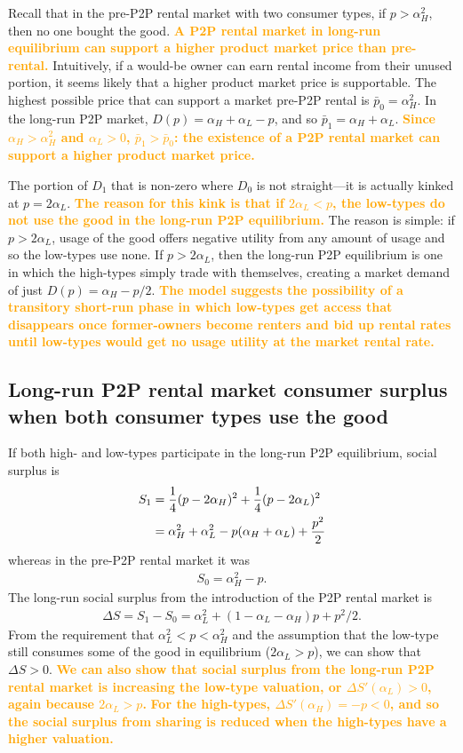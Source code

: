 \documentclass[11pt]{article}
\newcommand{\important}[1]{\textcolor{orange}{\textbf{#1}}}
\newcommand{\important}[1]{#1}
\begin{document}
Recall that in the pre-P2P rental market with two consumer types, if $p > \alpha_H^2$, then no one bought the good. 
\important{A P2P rental market in long-run equilibrium can support a higher product market price than pre-rental.}  
Intuitively, if a would-be owner can earn rental income from their unused portion, it seems likely that a higher product market price is supportable. 
The highest possible price that can support a market pre-P2P rental is $\bar{p}_0 = \alpha_H^2$.  
In the long-run P2P market, $D(p) = \alpha_H + \alpha_L - p$, and so $\bar{p}_{1} = \alpha_H + \alpha_L$. 
\important{Since $\alpha_H > \alpha_H^2$ and $\alpha_L > 0$, $\bar{p}_1 > \bar{p}_0$: the existence of a P2P rental market can support a higher product market price.} 

The portion of $D_1$ that is non-zero where $D_0$ is not straight---it is actually kinked at $p = 2\alpha_L$. 
\important{The reason for this kink is that if $2\alpha_L < p$, the low-types do not use the good in the long-run P2P equilibrium.} 
The reason is simple: if $p > 2\alpha_L$, usage of the good offers negative utility from any amount of usage and so the low-types use none. 
If $p > 2 \alpha_L$, then the long-run P2P equilibrium is one in which the high-types simply trade with themselves, creating a market demand of just $D(p) = \alpha_H - p/2$. 
\important{The model suggests the possibility of a transitory short-run phase in which low-types get access that disappears once former-owners become renters and bid up rental rates until low-types would get no usage utility at the market rental rate.} 

\subsection{Long-run P2P rental market consumer surplus when both consumer types use the good} 
If both high- and low-types participate in the long-run P2P equilibrium, social surplus is 
\begin{align} 
S_1 & = \frac{1}{4}(p - 2\alpha_H)^2 + \frac{1}{4}(p - 2\alpha_L)^2 \notag \\
    & = \alpha_H^2 + \alpha_L^2 - p(\alpha_H + \alpha_L) + \frac{p^2}{2} \notag \\ 
\end{align} 
whereas in the pre-P2P rental market it was 
\begin{align}
S_0 = \alpha_H^2 - p.  
\end{align} 
The long-run social surplus from the introduction of the P2P rental market is  
\begin{align}
\Delta S = S_1 - S_0 = \alpha_L^2 + (1 - \alpha_L - \alpha_H)p + p^2/2.  
\end{align} 
From the requirement that $\alpha_L^2 < p < \alpha_H^2$ and the assumption that the low-type still consumes some of the good in equilibrium ($2 \alpha_L > p$), we can show that $\Delta S > 0$. 
\important{We can also show that social surplus from the long-run P2P rental market is increasing the low-type valuation, or $\Delta S'(\alpha_L) > 0$, again because $2\alpha_L > p$.}
\important{For the high-types, $\Delta S'(\alpha_H) = -p < 0$, and so the social surplus from sharing is 
reduced when the high-types have a higher valuation.}
\end{document}
